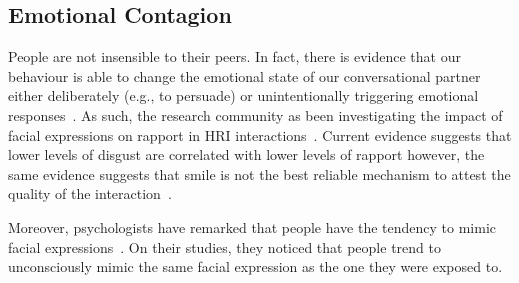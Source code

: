 \subsection{Emotional Contagion}
People are not insensible to their peers. In fact, there is evidence that our behaviour is able to change the emotional state of our conversational partner either deliberately (e.g., to persuade) or unintentionally triggering emotional responses~\cite{Dimberg2000, Chartrand1999, Hurley2012, Hess2010, Barsade2015}. As such, the research community as been investigating the impact of facial expressions on rapport in \ac{HRI} interactions~\cite{Melo2011, Wang2009}. Current evidence suggests that lower levels of disgust are correlated with lower levels of rapport however, the same evidence suggests that smile is not the best reliable mechanism to attest the quality of the interaction~\cite{Wang2009}.

Moreover, psychologists have remarked that people have the tendency to mimic facial expressions~\cite{Dimberg2000}. On their studies, they noticed that people trend to unconsciously mimic the same facial expression as the one they were exposed to.

